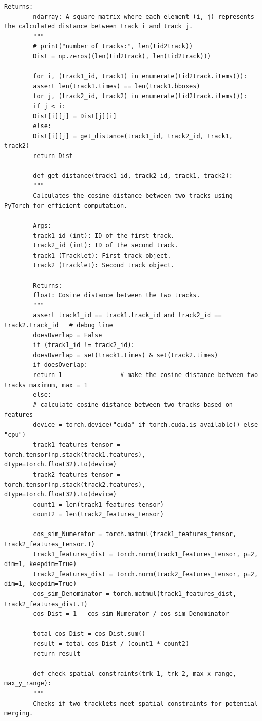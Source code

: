 \documentclass[12pt, a4paper, twoside]{article}
\begin{document}
\begin{lstlisting}[style=pythonstyle]
		Returns:
		ndarray: A square matrix where each element (i, j) represents the calculated distance between track i and track j.
		"""
		# print("number of tracks:", len(tid2track))
		Dist = np.zeros((len(tid2track), len(tid2track)))
		
		for i, (track1_id, track1) in enumerate(tid2track.items()):
		assert len(track1.times) == len(track1.bboxes)
		for j, (track2_id, track2) in enumerate(tid2track.items()):
		if j < i:
		Dist[i][j] = Dist[j][i]
		else:
		Dist[i][j] = get_distance(track1_id, track2_id, track1, track2)
		return Dist
		
		def get_distance(track1_id, track2_id, track1, track2):
		"""
		Calculates the cosine distance between two tracks using PyTorch for efficient computation.
		
		Args:
		track1_id (int): ID of the first track.
		track2_id (int): ID of the second track.
		track1 (Tracklet): First track object.
		track2 (Tracklet): Second track object.
		
		Returns:
		float: Cosine distance between the two tracks.
		"""
		assert track1_id == track1.track_id and track2_id == track2.track_id   # debug line
		doesOverlap = False
		if (track1_id != track2_id):
		doesOverlap = set(track1.times) & set(track2.times)
		if doesOverlap:
		return 1                # make the cosine distance between two tracks maximum, max = 1
		else:
		# calculate cosine distance between two tracks based on features
		device = torch.device("cuda" if torch.cuda.is_available() else "cpu")
		track1_features_tensor = torch.tensor(np.stack(track1.features), dtype=torch.float32).to(device)
		track2_features_tensor = torch.tensor(np.stack(track2.features), dtype=torch.float32).to(device)
		count1 = len(track1_features_tensor)
		count2 = len(track2_features_tensor)
		
		cos_sim_Numerator = torch.matmul(track1_features_tensor, track2_features_tensor.T)
		track1_features_dist = torch.norm(track1_features_tensor, p=2, dim=1, keepdim=True)
		track2_features_dist = torch.norm(track2_features_tensor, p=2, dim=1, keepdim=True)
		cos_sim_Denominator = torch.matmul(track1_features_dist, track2_features_dist.T)
		cos_Dist = 1 - cos_sim_Numerator / cos_sim_Denominator
		
		total_cos_Dist = cos_Dist.sum()
		result = total_cos_Dist / (count1 * count2)
		return result
		
		def check_spatial_constraints(trk_1, trk_2, max_x_range, max_y_range):
		"""
		Checks if two tracklets meet spatial constraints for potential merging.
		

\end{lstlisting}
\end{document}
